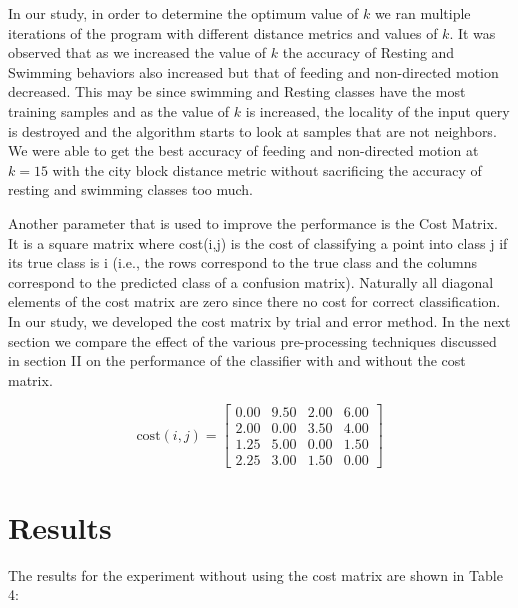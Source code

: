 \documentclass[conference]{IEEEtran}
\begin{document}
In our study, in order to determine the optimum value of $k$ we ran multiple iterations of the program with different distance metrics and values of $k$. It was observed that as we increased the value of $k$ the accuracy of Resting and Swimming behaviors also increased but that of feeding and non-directed motion decreased. This may be since swimming and Resting classes have the most training samples and as the value of $k$ is increased, the locality of the input query is destroyed and the algorithm starts to look at samples that are not neighbors.  We were able to get the best accuracy of feeding and non-directed motion at $k = 15$ with the city block distance metric without sacrificing the accuracy of resting and swimming classes too much.

Another parameter that is used to improve the performance is the Cost Matrix. It is a square matrix where cost(i,j) is the cost of classifying a point into class j if its true class is i (i.e., the rows correspond to the true class and the columns correspond to the predicted class of a confusion matrix). Naturally all diagonal elements of the cost matrix are zero since there no cost for correct classification. In our study, we developed the cost matrix by trial and error method. In the next section we compare the effect of the various pre-processing techniques discussed in section II on the performance of the classifier with and without the cost matrix.

$$
\mathrm{cost}(i, j) = \begin{bmatrix}
	0.00 & 9.50 & 2.00 & 6.00 \\
	2.00 & 0.00 & 3.50 & 4.00 \\
	1.25 & 5.00 & 0.00 & 1.50 \\
	2.25 & 3.00 & 1.50 & 0.00
\end{bmatrix}
$$

\section{Results}

The results for the experiment without using the cost matrix are shown in Table 4:
\end{document}

